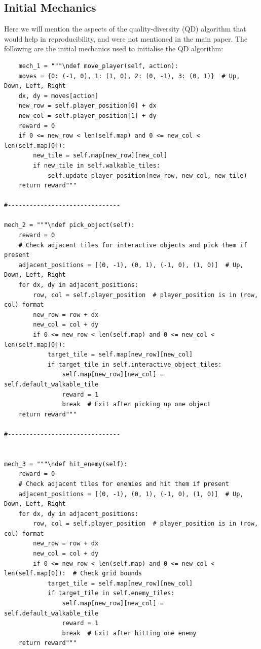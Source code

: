 \documentclass{article} %
\begin{document}
\subsection{Initial Mechanics}

Here we will mention the aspects of the quality-diversity (QD) algorithm that would help in reproducibility, and were not mentioned in the main paper. The following are the initial mechanics used to initialise the QD algorithm:

\begin{lstlisting}
    mech_1 = """\ndef move_player(self, action):
    moves = {0: (-1, 0), 1: (1, 0), 2: (0, -1), 3: (0, 1)}  # Up, Down, Left, Right
    dx, dy = moves[action]
    new_row = self.player_position[0] + dx
    new_col = self.player_position[1] + dy
    reward = 0
    if 0 <= new_row < len(self.map) and 0 <= new_col < len(self.map[0]):
        new_tile = self.map[new_row][new_col]
        if new_tile in self.walkable_tiles:
            self.update_player_position(new_row, new_col, new_tile)
    return reward"""

#------------------------------- 

mech_2 = """\ndef pick_object(self):
    reward = 0
    # Check adjacent tiles for interactive objects and pick them if present
    adjacent_positions = [(0, -1), (0, 1), (-1, 0), (1, 0)]  # Up, Down, Left, Right
    for dx, dy in adjacent_positions:
        row, col = self.player_position  # player_position is in (row, col) format
        new_row = row + dx
        new_col = col + dy
        if 0 <= new_row < len(self.map) and 0 <= new_col < len(self.map[0]):
            target_tile = self.map[new_row][new_col]
            if target_tile in self.interactive_object_tiles:
                self.map[new_row][new_col] = self.default_walkable_tile 
                reward = 1
                break  # Exit after picking up one object
    return reward"""

#------------------------------- 


mech_3 = """\ndef hit_enemy(self):
    reward = 0
    # Check adjacent tiles for enemies and hit them if present
    adjacent_positions = [(0, -1), (0, 1), (-1, 0), (1, 0)]  # Up, Down, Left, Right
    for dx, dy in adjacent_positions:
        row, col = self.player_position  # player_position is in (row, col) format
        new_row = row + dx
        new_col = col + dy
        if 0 <= new_row < len(self.map) and 0 <= new_col < len(self.map[0]):  # Check grid bounds
            target_tile = self.map[new_row][new_col]
            if target_tile in self.enemy_tiles:
                self.map[new_row][new_col] = self.default_walkable_tile
                reward = 1
                break  # Exit after hitting one enemy
    return reward"""


\end{lstlisting}
\end{document}
